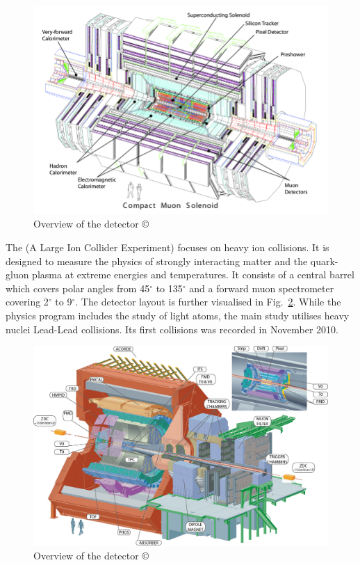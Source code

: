 \documentclass[bachelor,ngerman,english]{GAUBM}
\begin{document}
\begin{figure}[t]
    \centering
    \includegraphics[width=.8\textwidth]{figures/lhc/detector_cms.png}
    \caption{Overview of the \cms detector \copyright{\cern}}
    \label{fig:detector_cms}
\end{figure}

The \alice (A Large Ion Collider Experiment) \cite{other:alice} focuses on heavy ion collisions. It is designed to measure the physics of strongly interacting matter and the quark-gluon plasma at extreme energies and temperatures. It consists of a central barrel which covers polar angles from 45$^\circ$ to 135$^\circ$ and a forward muon spectrometer covering 2$^\circ$ to 9$^\circ$. The detector layout is further visualised in Fig.~\ref{fig:detector_alice}. While the \alice physics program includes the study of light atoms, the main study utilises heavy nuclei Lead-Lead collisions. Its first collisions was recorded in November 2010.

\begin{figure}[t]
    \centering
    \includegraphics[width=.8\textwidth]{figures/lhc/detector_alice.jpg}
    \caption{Overview of the \alice detector \copyright{\cern}}
    \label{fig:detector_alice}
\end{figure}
\end{document}
